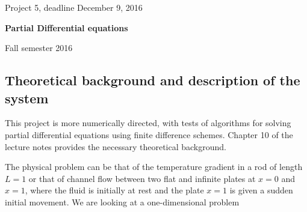 \documentclass[%
oneside,                 %
final,                   %
10pt]{article}
\begin{document}

\newcommand{\exercisesection}[1]{\subsection*{#1}}







\thispagestyle{empty}

\begin{center}
{\LARGE\bf
\begin{spacing}{1.25}
Project 5, deadline  December 9, 2016
\end{spacing}
}
\end{center}


\begin{center}
{\bf Partial Differential equations${}^{}$} \\ [0mm]
\end{center}

\begin{center}
\end{center}
    

\begin{center}
Fall semester 2016
\end{center}

\vspace{1cm}


\subsection*{Theoretical background and description of the system}

This project is more numerically directed, with tests
of algorithms for solving partial differential equations using finite difference schemes. 
Chapter 10 of the lecture notes provides the necessary theoretical background.

The physical problem can be that of the temperature gradient in a rod of length $L=1$ or that of channel flow
between two flat and infinite plates at $x=0$ and $x=1$, where the fluid is initially at rest
and the plate $x=1$ is given a sudden initial movement.  We are looking at a one-dimensional
problem
\end{document}
